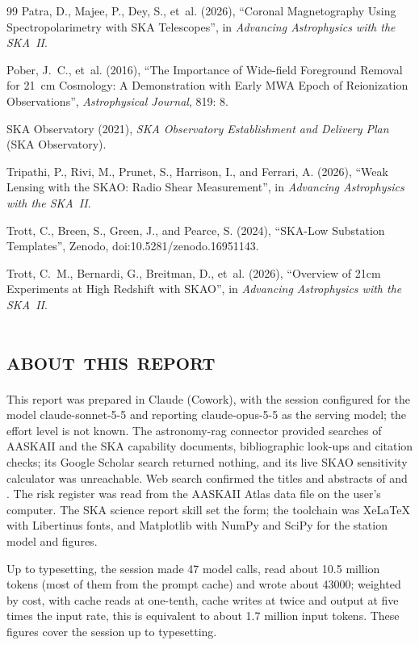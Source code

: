 \documentclass[11pt,a4paper]{article}
\begin{document}
\begin{thebibliography}{99}
Patra, D., Majee, P., Dey, S., et~al. (2026), \enquote{Coronal Magnetography Using Spectropolarimetry with SKA Telescopes}, in \emph{Advancing Astrophysics with the SKA~II}.

Pober, J.~C., et~al. (2016), \enquote{The Importance of Wide-field Foreground Removal for 21~cm Cosmology: A Demonstration with Early MWA Epoch of Reionization Observations}, \emph{Astrophysical Journal}, 819: 8.

SKA Observatory (2021), \emph{SKA Observatory Establishment and Delivery Plan} (SKA Observatory).

Tripathi, P., Rivi, M., Prunet, S., Harrison, I., and Ferrari, A. (2026), \enquote{Weak Lensing with the SKAO: Radio Shear Measurement}, in \emph{Advancing Astrophysics with the SKA~II}.

Trott, C., Breen, S., Green, J., and Pearce, S. (2024), \enquote{SKA-Low Substation Templates}, Zenodo, doi:10.5281/zenodo.16951143.

Trott, C.~M., Bernardi, G., Breitman, D., et~al. (2026), \enquote{Overview of 21cm Experiments at High Redshift with SKAO}, in \emph{Advancing Astrophysics with the SKA~II}.
\end{thebibliography}

\section*{\scshape about this report}
\small
This report was prepared in Claude (Cowork), with the session configured for the model claude-sonnet-5-5 and reporting claude-opus-5-5 as the serving model; the effort level is not known. The astronomy-rag connector provided searches of AASKAII and the SKA capability documents, bibliographic look-ups and citation checks; its Google Scholar search returned nothing, and its live SKAO sensitivity calculator was unreachable. Web search confirmed the titles and abstracts of \citet{Mort2017} and \citet{Grigg2025}. The risk register was read from the AASKAII Atlas data file on the user's computer. The SKA science report skill set the form; the toolchain was XeLaTeX with Libertinus fonts, and Matplotlib with NumPy and SciPy for the station model and figures.

Up to typesetting, the session made 47 model calls, read about 10.5 million tokens (most of them from the prompt cache) and wrote about \num{43000}; weighted by cost, with cache reads at one-tenth, cache writes at twice and output at five times the input rate, this is equivalent to about 1.7 million input tokens. These figures cover the session up to typesetting.
\end{document}
